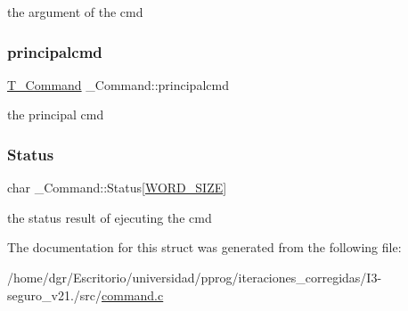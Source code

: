 the argument of the cmd \mbox{\label{struct__Command_a099eea30318b79292723aaf348393eb3}} 
\subsubsection{\texorpdfstring{principalcmd}{principalcmd}}
{\footnotesize\ttfamily \hyperlink{command_8h_a0473597db8c45c0289b6b8e2f8abbe32}{T\+\_\+\+Command} \+\_\+\+Command\+::principalcmd}

the principal cmd \mbox{\label{struct__Command_aed496fc04257ae186688187815e0390c}} 
\subsubsection{\texorpdfstring{Status}{Status}}
{\footnotesize\ttfamily char \+\_\+\+Command\+::\+Status\mbox{[}\hyperlink{types_8h_a92ed8507d1cd2331ad09275c5c4c1c89}{W\+O\+R\+D\+\_\+\+S\+I\+ZE}\mbox{]}}

the status result of ejecuting the cmd 

The documentation for this struct was generated from the following file\+:\begin{DoxyCompactItemize}
\item 
/home/dgr/\+Escritorio/universidad/pprog/iteraciones\+\_\+corregidas/\+I3-\/seguro\+\_\+v21./src/\hyperlink{command_8c}{command.\+c}\end{DoxyCompactItemize}
